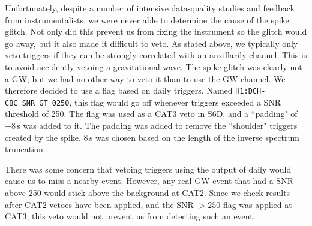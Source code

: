 Unfortunately, despite a number of intensive data-quality studies and feedback from instrumentalists, we were never able to determine the cause of the spike glitch. Not only did this prevent us from fixing the instrument so the glitch would go away, but it also made it difficult to veto. As stated above, we typically only veto triggers if they can be strongly correlated with an auxillarily channel. This is to avoid accidently vetoing a gravitational-wave. The spike glitch was clearly not a \ac{GW}, but we had no other way to veto it than to use the \ac{GW} channel. We therefore decided to use a flag based on daily \ihope triggers. Named \verb|H1:DCH-CBC_SNR_GT_0250|, this flag would go off whenever triggers exceeded a \ac{SNR} threshold of 250. The flag was used as a CAT3 veto in S6D, and a ``padding" of $\pm8\,$s was added to it. The padding was added to remove the ``shoulder" triggers created by the spike. $8\,$s was chosen based on the length of the inverse spectrum truncation.

There was some concern that vetoing triggers using the output of daily \ihope would cause us to miss a nearby event. However, any real \ac{GW} event that had a \ac{SNR} above 250 would stick above the background at CAT2. Since we check results after CAT2 vetoes have been applied, and the \ac{SNR} $> 250$ flag was applied at CAT3, this veto would not prevent us from detecting such an event.

